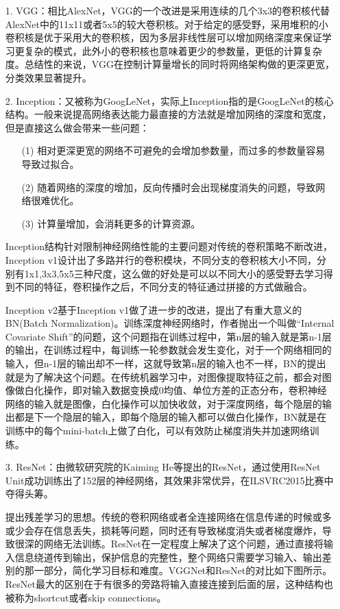 \begin{itemize}
  \item [1.]VGG：相比AlexNet，VGG的一个改进是采用连续的几个3x3的卷积核代替AlexNet中的11x11或者5x5的较大卷积核。对于给定的感受野，采用堆积的小卷积核是优于采用大的卷积核，因为多层非线性层可以增加网络深度来保证学习更复杂的模式，此外小的卷积核也意味着更少的参数量，更低的计算复杂度。总结性的来说，VGG在控制计算量增长的同时将网络架构做的更深更宽，分类效果显著提升。
\item [2.]Inception：又被称为GoogLeNet，实际上Inception指的是GoogLeNet的核心结构。一般来说提高网络表达能力最直接的方法就是增加网络的深度和宽度，但是直接这么做会带来一些问题：
\begin{itemize}
  \item [(1)]相对更深更宽的网络不可避免的会增加参数量，而过多的参数量容易导致过拟合。
  \item [(2)] 随着网络的深度的增加，反向传播时会出现梯度消失的问题，导致网络很难优化。
  \item [(3)] 计算量增加，会消耗更多的计算资源。
\end{itemize}

Inception结构针对限制神经网络性能的主要问题对传统的卷积策略不断改进，Inception v1设计出了多路并行的卷积模块，不同分支的卷积核大小不同，分别有1x1,3x3,5x5三种尺度，这么做的好处是可以以不同大小的感受野去学习得到不同的特征，卷积操作之后，不同分支的特征通过拼接的方式做融合。

Inception v2\cite{ioffe2015batch}基于Inception v1做了进一步的改进，提出了有重大意义的BN(Batch Normalization)。训练深度神经网络时，作者抛出一个叫做“Internal Covariate Shift”的问题，这个问题指在训练过程中，第n层的输入就是第n-1层的输出，在训练过程中，每训练一轮参数就会发生变化，对于一个网络相同的输入，但n-1层的输出却不一样，这就导致第n层的输入也不一样，BN的提出就是为了解决这个问题。在传统机器学习中，对图像提取特征之前，都会对图像做白化操作，即对输入数据变换成0均值、单位方差的正态分布，卷积神经网络的输入就是图像，白化操作可以加快收敛，对于深度网络，每个隐层的输出都是下一个隐层的输入，即每个隐层的输入都可以做白化操作，BN就是在训练中的每个mini-batch上做了白化，可以有效防止梯度消失并加速网络训练。

\item [3.]ResNet：由微软研究院的Kaiming He等提出的ResNet，通过使用ResNet Unit成功训练出了152层的神经网络，其效果非常优异，在ILSVRC2015比赛中夺得头筹。

提出残差学习的思想。传统的卷积网络或者全连接网络在信息传递的时候或多或少会存在信息丢失，损耗等问题，同时还有导致梯度消失或者梯度爆炸，导致很深的网络无法训练。ResNet在一定程度上解决了这个问题，通过直接将输入信息绕道传到输出，保护信息的完整性，整个网络只需要学习输入、输出差别的那一部分，简化学习目标和难度。VGGNet和ResNet的对比如下图所示。ResNet最大的区别在于有很多的旁路将输入直接连接到后面的层，这种结构也被称为shortcut或者skip connections。


\end{itemize}
